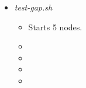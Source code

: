 \documentclass[letterpaper]{article}
\begin{document}
\begin{itemize}
\item {\em test-gap.sh}
\begin{itemize}
\item Starts 5 nodes. 
\item 
\item 
\item 
\item 
\end{itemize}

\end{itemize}
\end{document}

